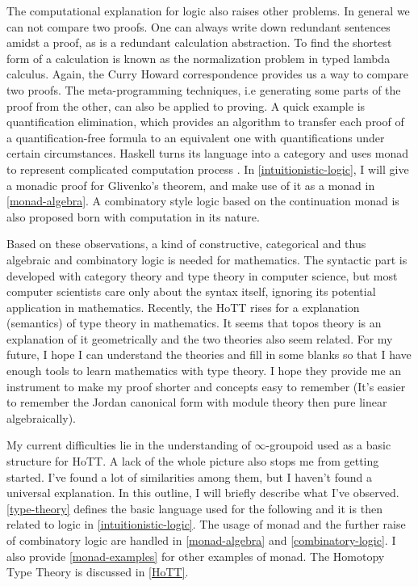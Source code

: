 \documentclass[12pt,a4paper]{report}
\begin{document}
The computational explanation for logic also raises other problems.
In general we can not compare two proofs. One can always write down
redundant sentences amidst a proof, as is a redundant calculation
abstraction. To find the shortest form of a calculation is known as
the normalization problem in typed lambda calculus\cite{Curry-Howard}.
Again, the Curry Howard correspondence provides us a way to compare two
proofs. The meta-programming techniques, i.e generating some parts of
the proof from the other, can also be applied to proving. A quick example
is quantification elimination, which provides an algorithm to transfer
each proof of a quantification-free formula to an equivalent one with
quantifications under certain circumstances. Haskell
turns its language into a category and uses monad to represent
complicated computation process 
\cite{the-essence-of-functional-programming}. 
In \autoref{intuitionistic-logic},
I will give a monadic proof for Glivenko's theorem, and make use of
it as a monad in \autoref{monad-algebra}. A combinatory style logic 
based on the continuation monad is also proposed born with computation 
in its nature. 

Based on these observations, a kind of constructive, categorical and 
thus algebraic and combinatory logic is needed for mathematics. The
syntactic part is developed with category theory and type theory in
computer science, but most computer scientists care only about the
syntax itself, ignoring its potential application in mathematics. 
Recently, the HoTT rises for a explanation (semantics)
of type theory in mathematics. It seems that topos theory is an
explanation of it geometrically and the two theories also seem related.
For my future, I hope I can understand the theories and fill in some
blanks so that I have enough tools to learn mathematics with type
theory. I hope they provide me an instrument to make my proof shorter
and concepts easy to remember (It's easier to remember the Jordan
canonical form with module theory then pure linear algebraically).

My current difficulties lie in the understanding of $\infty$-groupoid
used as a basic structure for HoTT. A lack of the whole
picture also stops me from getting started. I've found a lot of 
similarities among them, but I haven't found a universal explanation. 
In this outline, I will briefly describe what I've observed. 
\autoref{type-theory} defines the basic language used for the
following and it is then related to logic in 
\autoref{intuitionistic-logic}. The usage of monad and the further
raise of combinatory logic are handled in \autoref{monad-algebra} and
\autoref{combinatory-logic}. I also provide \autoref{monad-examples}
for other examples of monad. The Homotopy Type Theory is discussed
in \autoref{HoTT}. 
\end{document}
